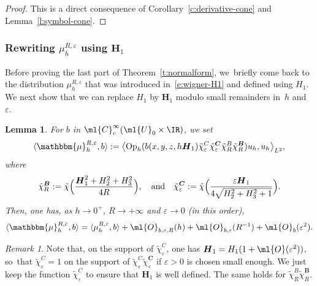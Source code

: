 \documentclass[JEP,XML,SOM,Unicode, NoEqCountersInSection,published]{cedram}
\let\bm\mathbbm
\theoremstyle{plain}
\newtheorem{lemm}[theo]{Lemma}
\theoremstyle{definition}
\theoremstyle{remark}
\newtheorem{rema}[theo]{Remark}
\newcommand{\Op}{\operatorname{Op}}
\begin{document}
\begin{proof}
This is a direct consequence of Corollary~\ref{c:derivative-cone} and Lemma~\ref{l:symbol-cone}.
\end{proof}

\subsubsection{Rewriting $\mu_{h}^{R,\varepsilon}$ using $\boldsymbol{H}_1$}

Before proving the last part of Theorem~\ref{t:normalform}, we~briefly come back to the distribution $\mu_{h}^{R,\varepsilon}$ that was introduced in~\eqref{e:wigner-H1} and defined using $H_1$. We next show that we can replace $H_1$ by $\boldsymbol{H}_1$ modulo small remainders in~$h$ and~$\varepsilon$.

\begin{lemm}\label{l:wigner} For $b$ in $\ml{C}^\infty_c(\ml{U}_0\times\IR)$, we set
\begin{equation}
\label{e:black_mu}
\langle \bm{\mu}_{h}^{R,\varepsilon},b\rangle:=\bigl\langle \Op_h(b(x,y,z,h\boldsymbol{H}_1)\tilde{\chi}_\varepsilon^C\tilde{\chi}_\varepsilon^{\boldsymbol{C}}\tilde{\chi}_R^B\tilde{\chi}_R^{\boldsymbol{B}})u_h,u_h\bigr\rangle_{L^2},
\end{equation}
where
\[
\tilde{\chi}_R^{\boldsymbol{B}}:=\tilde{\chi}\Bigl(\frac{\boldsymbol{H}_1^2+H_2^2+H_3^2}{4R}\Bigr),\quad\text{and}\quad\tilde{\chi}_\varepsilon^{\boldsymbol{C}}:=\tilde{\chi}\Bigl(\frac{\varepsilon \boldsymbol{H}_1}{4\sqrt{H_2^2+H_3^2+1}}\Bigr).
\]
Then, one has, as $h\to 0^+$, $R\to+\infty$ and $\varepsilon\to 0$ (in this order),
\[
\langle\bm{\mu}_{h}^{R,\varepsilon},b\rangle=\langle\mu_{h}^{R,\varepsilon},b\rangle+\ml{O}_{b,\varepsilon,R}(h)+\ml{O}_{b,\varepsilon}(R^{-1})+\ml{O}_b(\varepsilon^2).
\]
\end{lemm}
\begin{rema}\label{r:support}
Note that, on the support of $\tilde{\chi}_\varepsilon^C$, one has $\boldsymbol{H}_1=H_1(1+\ml{O}(\varepsilon^2))$, so~that $\tilde{\chi}_\varepsilon^C=1$ on the support of $\tilde{\chi}_\varepsilon^C\tilde{\chi}_\varepsilon^{\boldsymbol{C}}$ if $\varepsilon>0$ is chosen small enough. We just keep the function $\tilde{\chi}_\varepsilon^C$ to ensure that $\boldsymbol{H}_1$ is well defined. The same holds for $\tilde{\chi}_R^B\tilde{\chi}_R^{\boldsymbol{B}}$.
\end{rema}
\end{document}
